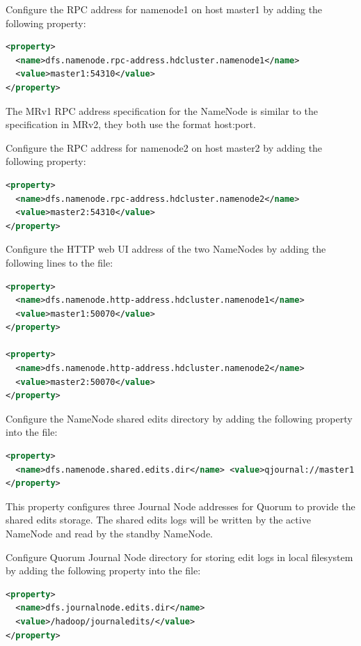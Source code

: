 Configure the RPC address for namenode1 on host master1 by adding the following property:
\lstset{style=bashstyle}
\begin{lstlisting}[language=XML]
<property>
  <name>dfs.namenode.rpc-address.hdcluster.namenode1</name>
  <value>master1:54310</value>
</property>
\end{lstlisting}

The MRv1 RPC address specification for the NameNode is similar to the specification in MRv2, they both use the format host:port.

Configure the RPC address for namenode2 on host master2 by adding the following property:
\lstset{style=bashstyle}
\begin{lstlisting}[language=XML]
<property>
  <name>dfs.namenode.rpc-address.hdcluster.namenode2</name>
  <value>master2:54310</value>
</property>
\end{lstlisting}

Configure the HTTP web UI address of the two NameNodes by adding the following lines to the file:
\lstset{style=bashstyle}
\begin{lstlisting}[language=XML]
<property>
  <name>dfs.namenode.http-address.hdcluster.namenode1</name>
  <value>master1:50070</value>
</property>

<property>
  <name>dfs.namenode.http-address.hdcluster.namenode2</name>
  <value>master2:50070</value>
</property>
\end{lstlisting}

Configure the NameNode shared edits directory by adding the following property into the file:
\lstset{style=bashstyle}
\begin{lstlisting}[language=XML]
<property>
  <name>dfs.namenode.shared.edits.dir</name> <value>qjournal://master1:8485;master1:8486;master2:8485/hdcluster</value>
</property>
\end{lstlisting}

This property configures three Journal Node addresses for Quorum to provide the shared edits storage. The shared edits logs will be written by the active NameNode and read by the standby NameNode.

Configure Quorum Journal Node directory for storing edit logs in local filesystem by adding the following property into the file:
\lstset{style=bashstyle}
\begin{lstlisting}[language=XML]
<property>
  <name>dfs.journalnode.edits.dir</name>
  <value>/hadoop/journaledits/</value>
</property>
\end{lstlisting}


